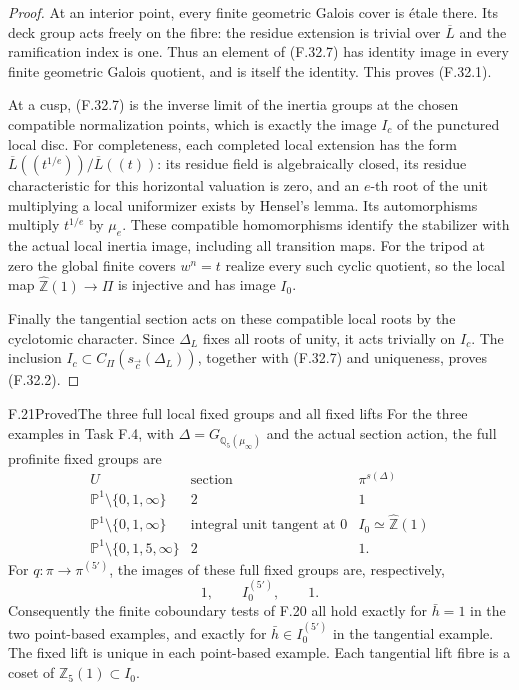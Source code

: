 \begin{proof}
At an interior point, every finite geometric
Galois cover is \'{e}tale there.
Its deck group acts freely on the fibre:
the residue extension is trivial over
$\overline L$ and the ramification index is one.
Thus an element of (F.32.7) has identity image
in every finite geometric Galois quotient,
and is itself the identity.  This proves
(F.32.1).

At a cusp, (F.32.7) is the inverse limit of the
inertia groups at the chosen compatible
normalization points, which is exactly the
image $I_c$ of the punctured local disc.
For completeness, each completed local
extension has the form
$\overline L((t^{1/e}))/\overline L((t))$:
its residue field is algebraically closed,
its residue characteristic for this
horizontal valuation is zero, and an
$e$-th root of the unit multiplying a local
uniformizer exists by Hensel's lemma.
Its automorphisms multiply $t^{1/e}$ by
$\mu_e$.
These compatible homomorphisms identify the
stabilizer with the actual local inertia image,
including all transition maps.
For the tripod at zero the global finite
covers $w^n=t$ realize every such cyclic
quotient, so the local map
$\widehat{\mathbb Z}(1)\to\Pi$ is injective
and has image $I_0$.

Finally the tangential section acts on these
compatible local roots by the cyclotomic
character.  Since $\Delta_L$ fixes all roots
of unity, it acts trivially on $I_c$.
The inclusion $I_c\subset
C_\Pi(s_{\vec c}(\Delta_L))$, together with
(F.32.7) and uniqueness, proves (F.32.2).
\end{proof}
\begin{statement}{F.21}{Proved}{The three full local fixed groups and all fixed lifts}
For the three examples in Task F.4, with
$\Delta=G_{\mathbb Q_5(\mu_\infty)}$ and the actual
section action, the full profinite fixed groups are
\[
 \begin{array}{c|c|c}
 U&\text{section}&\pi^{s(\Delta)}\\ \hline
 \mathbb P^1\setminus\{0,1,\infty\}&2&1\\
 \mathbb P^1\setminus\{0,1,\infty\}
        &\text{integral unit tangent at }0
        &I_0\simeq\widehat{\mathbb Z}(1)\\
 \mathbb P^1\setminus\{0,1,5,\infty\}&2&1 .
 \end{array}                                               \tag{F.21.1}
\]
For $q:\pi\to\pi^{(5')}$, the images of these
full fixed groups are, respectively,
\[
            1,\qquad I_0^{(5')},\qquad 1.                  \tag{F.21.2}
\]
Consequently the finite coboundary tests of F.20
all hold exactly for $\bar h=1$ in the two
point-based examples, and exactly for
$\bar h\in I_0^{(5')}$ in the tangential example.
The fixed lift is unique in each point-based
example.  Each tangential lift fibre is a coset
of $\mathbb Z_5(1)\subset I_0$.
\end{statement}
